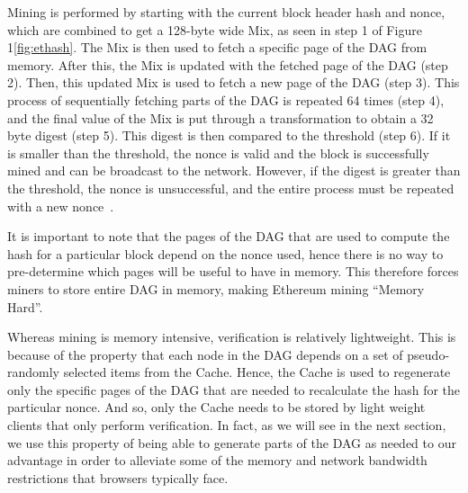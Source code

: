\documentclass[runningheads]{llncs}
\begin{document}
Mining is performed by starting with the current block header hash and nonce, which are combined to get a 128-byte wide Mix, as seen in step 1 of Figure 1\ref{fig:ethash}. The Mix is then used to fetch a specific page of the DAG from memory. After this, the Mix is updated with the fetched page of the DAG (step 2). Then, this updated Mix is used to fetch a new page of the DAG (step 3). This process of sequentially fetching parts of the DAG is repeated 64 times (step 4), and the final value of the Mix is put through a transformation to obtain a 32 byte digest (step 5). This digest is then compared to the threshold (step 6). If it is smaller than the threshold, the nonce is valid and the block is successfully mined and can be broadcast to the network. However, if the digest is greater than the threshold, the nonce is unsuccessful, and the entire process must be repeated with a new nonce~\cite{Ethmining}. 


It is important to note that the pages of the DAG that are used to compute the hash for a particular block depend on the nonce used, hence there is no way to pre-determine which pages will be useful to have in memory. This therefore forces miners to store entire DAG in memory, making Ethereum mining ``Memory Hard''. 


Whereas mining is memory intensive, verification is relatively lightweight. This is because of the property that each node in the DAG depends on a set of pseudo-randomly selected items from the Cache. Hence, the Cache is used to regenerate only the specific pages of the DAG that are needed to recalculate the hash for the particular nonce. And so, only the Cache needs to be stored by light weight clients that only perform verification. In fact, as we will see in the next section, we use this property of being able to generate parts of the DAG as needed to our advantage in order to alleviate some of the memory and network bandwidth restrictions that browsers typically face.
\end{document}
